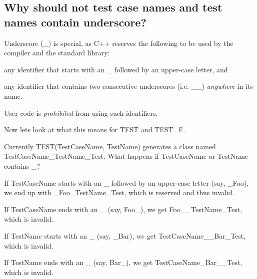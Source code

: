 \subsection*{Why should not test case names and test names contain underscore?}

Underscore ({\ttfamily \+\_\+}) is special, as C++ reserves the following to be used by the compiler and the standard library\+:


\begin{DoxyEnumerate}
\item any identifier that starts with an {\ttfamily \+\_\+} followed by an upper-\/case letter, and
\end{DoxyEnumerate}
\begin{DoxyEnumerate}
\item any identifier that contains two consecutive underscores (i.\+e. {\ttfamily \+\_\+\+\_\+}) {\itshape anywhere} in its name.
\end{DoxyEnumerate}

User code is {\itshape prohibited} from using such identifiers.

Now let\textquotesingle{}s look at what this means for {\ttfamily T\+E\+ST} and {\ttfamily T\+E\+S\+T\+\_\+F}.

Currently {\ttfamily T\+E\+S\+T(\+Test\+Case\+Name, Test\+Name)} generates a class named {\ttfamily Test\+Case\+Name\+\_\+\+Test\+Name\+\_\+\+Test}. What happens if {\ttfamily Test\+Case\+Name} or {\ttfamily Test\+Name} contains {\ttfamily \+\_\+}?


\begin{DoxyEnumerate}
\item If {\ttfamily Test\+Case\+Name} starts with an {\ttfamily \+\_\+} followed by an upper-\/case letter (say, {\ttfamily \+\_\+\+Foo}), we end up with {\ttfamily \+\_\+\+Foo\+\_\+\+Test\+Name\+\_\+\+Test}, which is reserved and thus invalid.
\end{DoxyEnumerate}
\begin{DoxyEnumerate}
\item If {\ttfamily Test\+Case\+Name} ends with an {\ttfamily \+\_\+} (say, {\ttfamily Foo\+\_\+}), we get {\ttfamily Foo\+\_\+\+\_\+\+Test\+Name\+\_\+\+Test}, which is invalid.
\end{DoxyEnumerate}
\begin{DoxyEnumerate}
\item If {\ttfamily Test\+Name} starts with an {\ttfamily \+\_\+} (say, {\ttfamily \+\_\+\+Bar}), we get {\ttfamily Test\+Case\+Name\+\_\+\+\_\+\+Bar\+\_\+\+Test}, which is invalid.
\end{DoxyEnumerate}
\begin{DoxyEnumerate}
\item If {\ttfamily Test\+Name} ends with an {\ttfamily \+\_\+} (say, {\ttfamily Bar\+\_\+}), we get {\ttfamily Test\+Case\+Name\+\_\+\+Bar\+\_\+\+\_\+\+Test}, which is invalid.
\end{DoxyEnumerate}

